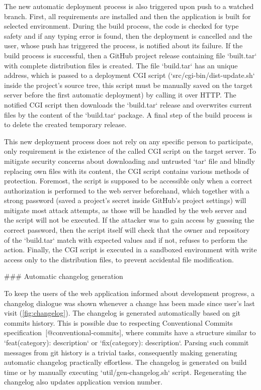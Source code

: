 \documentclass[
  digital, %
  oneside, %
  lof,     %
  nolot,     %
]{fithesis4}
\begin{document}
{The new automatic deployment process is also triggered upon push to a watched branch. First, all requirements are installed and then the application is built for selected environment. During the build process, the code is checked for type safety and if any typing error is found, then the deployment is cancelled and the user, whose push has triggered the process, is notified about its failure. If the build process is successful, then a GitHub project release containing file `built.tar` with complete distribution files is created. The file `build.tar` has an unique address, which is passed to a deployment CGI script (`src/cgi-bin/dist-update.sh` inside the project's source tree, this script must be manually saved on the target server before the first automatic deployment) by calling it over HTTP. The notified CGI script then downloads the `build.tar` release and overwrites current files by the content of the `build.tar` package. A final step of the build process is to delete the created temporary release.

This new deployment process does not rely on any specific person to participate, only requirement is the existence of the called CGI script on the target server. To mitigate security concerns about downloading and untrusted `tar` file and blindly replacing own files with its content, the CGI script contains various methods of protection. Foremost, the script is supposed to be accessible only when a correct authorization is performed to the web server beforehand, which together with a strong password (saved a project's secret inside GitHub's project settings) will mitigate most attack attempts, as those will be handled by the web server and the script will not be executed. If the attacker was to gain access by guessing the correct password, then the script itself will check that the owner and repository of the `build.tar` match with expected values and if not, refuses to perform the action. Finally, the CGI script is executed in a sandboxed environment with write access only to the distribution files, to prevent accidental file modification.

### Automatic changelog generation
\label{chap:changelog}

To keep the users of the web application informed about development progress, a changelog dialogue was shown whenever a change has been made since user's last visit (\autoref{fig:changelog}). The changelog is generated automatically based on git commits history. This is possible due to respecting Conventional Commits specification~[@conventional-commits], where commits have a structure similar to `feat(category): description` or `fix(category): description`. Parsing such commit messages from git history is a trivial tasks, consequently making generating automatic changelog practically effortless. The changelog is generated on build time or by manually executing `util/gen-changelog.sh` script. Regenerating the changelog also updates application version number.

}
\end{document}
